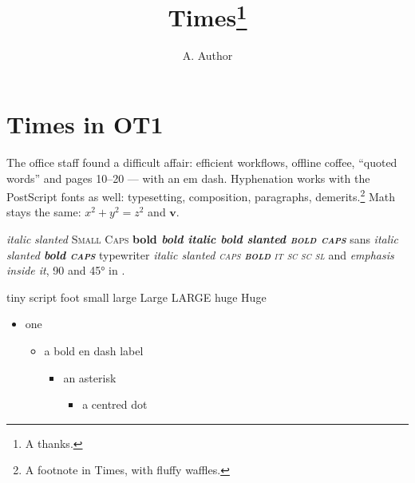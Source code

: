 \documentclass[12pt]{article}
\title{Times\thanks{A thanks.}}
\author{A. Author}
\date{}
\begin{document}
\maketitle
\section{Times in OT1}
The office staff found a difficult affair: efficient workflows, offline coffee, ``quoted words'' and pages 10--20 --- with an em dash. Hyphenation works with the PostScript fonts as well: typesetting, composition, paragraphs, demerits.\footnote{A footnote in Times, with fluffy waffles.} Math stays the same: $x^2+y^2=z^2$ and $\mathbf{v}$.

{\itshape italic} {\slshape slanted} {\scshape Small Caps} {\bfseries bold \itshape bold italic \slshape bold slanted \scshape bold caps}
{\sffamily sans \itshape italic \slshape slanted \bfseries bold \scshape caps} {\ttfamily typewriter \itshape italic \slshape slanted \scshape caps \bfseries bold}
{\itshape\scshape it sc} {\scshape\slshape sc sl} and \emph{emphasis \emph{inside} it}, 90\textdegree{} and 45° in .

{\tiny tiny} {\scriptsize script} {\footnotesize foot} {\small small} {\large large} {\Large Large} {\LARGE LARGE} {\huge huge} {\Huge Huge}

\begin{itemize}
\item one
  \begin{itemize}
  \item a bold en dash label
    \begin{itemize}
    \item an asterisk
      \begin{itemize}
      \item a centred dot
      \end{itemize}
    \end{itemize}
  \end{itemize}
\end{itemize}
\end{document}
